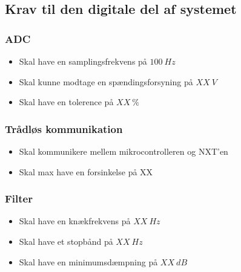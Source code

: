 \subsection{Krav til den digitale del af systemet}

\subsubsection{ADC}
\begin{itemize}
\item Skal have en samplingsfrekvens på $100~Hz$
\item Skal kunne modtage en spændingsforsyning på  $XX~V$
\item Skal have en tolerence på $XX~\%$
\end{itemize}

\subsubsection{Trådløs kommunikation}
\begin{itemize}
\item Skal kommunikere mellem mikrocontrolleren og NXT'en 
\item Skal max have en forsinkelse på XX
\end{itemize}

\subsubsection{Filter}
\begin{itemize}
\item Skal have en knækfrekvens på $XX~Hz$
\item Skal have et stopbånd på $XX~Hz$
\item Skal have en minimumsdæmpning på $XX~dB$
\end{itemize}